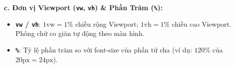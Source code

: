 \documentclass[11pt,oneside]{book}
\newcommand{\codeinline}[1]{\textcolor{accentOrange}{\texttt{#1}}}
\begin{document}
\begin{tipBox}
\par\vspace{4pt}

\begin{tcolorbox}[arc=4pt, colback=white, colframe=accentOrange!30, boxrule=0.6pt, top=6pt, bottom=6pt, left=10pt, right=10pt]
  {\sffamily\bfseries\color{accentOrange} c. Đơn vị Viewport (\codeinline{vw}, \codeinline{vh}) \& Phần Trăm (\codeinline{\%}):}\par\vspace{3pt}
  \begin{itemize}[leftmargin=1.2em, itemsep=2pt, parsep=0pt]
      \item \textbf{\codeinline{vw} / \codeinline{vh}}: $1\text{vw} = 1\%$ chiều rộng Viewport; $1\text{vh} = 1\%$ chiều cao Viewport. Phông chữ co giãn tự động theo màn hình.
      \item \textbf{\codeinline{\%}}: Tỷ lệ phần trăm so với font-size của phần tử cha (ví dụ: $120\%$ của $20\text{px} = 24\text{px}$).
  \end{itemize}
\end{tcolorbox}
\end{tipBox}
\end{document}
